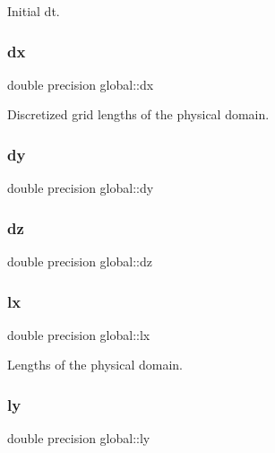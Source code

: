 Initial dt. 

\mbox{\label{namespaceglobal_a9c5f8c3cf5f9b496608059fc13776b4c}} 
\subsubsection{\texorpdfstring{dx}{dx}}
{\footnotesize\ttfamily double precision global\+::dx}



Discretized grid lengths of the physical domain. 

\mbox{\label{namespaceglobal_aa2d01c0b9c06af88ae13136658fc3dd9}} 
\subsubsection{\texorpdfstring{dy}{dy}}
{\footnotesize\ttfamily double precision global\+::dy}

\mbox{\label{namespaceglobal_a4015487c561985eefa8cabc39f591540}} 
\subsubsection{\texorpdfstring{dz}{dz}}
{\footnotesize\ttfamily double precision global\+::dz}

\mbox{\label{namespaceglobal_ac5d2ea39fc192fbb8354e665dc91b759}} 
\subsubsection{\texorpdfstring{lx}{lx}}
{\footnotesize\ttfamily double precision global\+::lx}



Lengths of the physical domain. 

\mbox{\label{namespaceglobal_a6a6ee40bbab9e114aa217f7d8570b924}} 
\subsubsection{\texorpdfstring{ly}{ly}}
{\footnotesize\ttfamily double precision global\+::ly}

